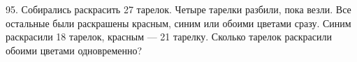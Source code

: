 95. Собирались раскрасить 27 тарелок. Четыре тарелки разбили, пока везли. Все остальные были раскрашены красным, синим или обоими цветами сразу. Синим раскрасили 18 тарелок, красным --- 21 тарелку. Сколько тарелок раскрасили обоими цветами одновременно?\\
